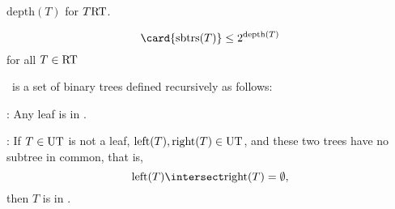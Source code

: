 \iffalse
\begin{lemma}\label{lem:finsubtrees}
Every tree in \rectree\ has only a finite number of subtrees.
\end{lemma}

\begin{proof}
The proof is by structural induction on the definition of \rectree.

\inductioncase{Base case}: If $T$ is a leaf, then $T$ has only one
subtree, namely, itself.

\inductioncase{Constructor case}: If $T \in \rectree$ is not a leaf,
then $\card{\subtrees{\leftsub{T}}}$ and $\card{\subtrees{\rightsub{T}}}$ are
finite by induction hypothesis.  Therefore
\[
\card{\subtrees{T}} \leq 1 + \card{\subtrees{\leftsub{T}}} +
\card{\subtrees{\rightsub{T}}}.
\]
\end{proof}
\fi

\begin{definition}
$\text{depth}(T)$ for $T \text{RT}$.
\end{definition}

\begin{lemma}\label{}
\[
\card{\subtrees{T}} \leq 2^{\text{depth}(T)}
\]
for all $T \in \rectree$
\end{lemma}

\iffalse
How come we have ``$\leq$'' instead of ``$=$'' in the proof of
Lemma~\ref{lem:finsubtrees}?  The answer is that the definition of
\rectree\ allows lots of sharing of subtrees.

Though there is no infinite weirdness left in \rectree, there may be
some unexpected \emph{sharing} of subtrees.  It is actually is
possible to have a $\rectree$ with whose left and right subtrees are
the same.  It is also possible for all the different top to bottom
paths end at the \emph{same} leaf.

Sharing of subtrees can be a very useful in getting a compact
representation of a tree, but it seriously complicates adding or
removing values from search trees.  So we will finally restrict
ourselves to the set \ubt\ of \term{unsharing} recursive binary trees
\fi


\begin{definition}
\ubt\ is a set of binary trees defined recursively as follows:

:  Any leaf is in \ubt.

: If $T \in \text{UT}$ is not a leaf,
$\text{left}(T), \text{right}(T) \in \text{UT}$, and these two trees
have no subtree in common, that is,
\[
\leftsub{T} \intersect \rightsub{T} = \emptyset,
\]
then $T$ is in \ubt.
\end{definition}

